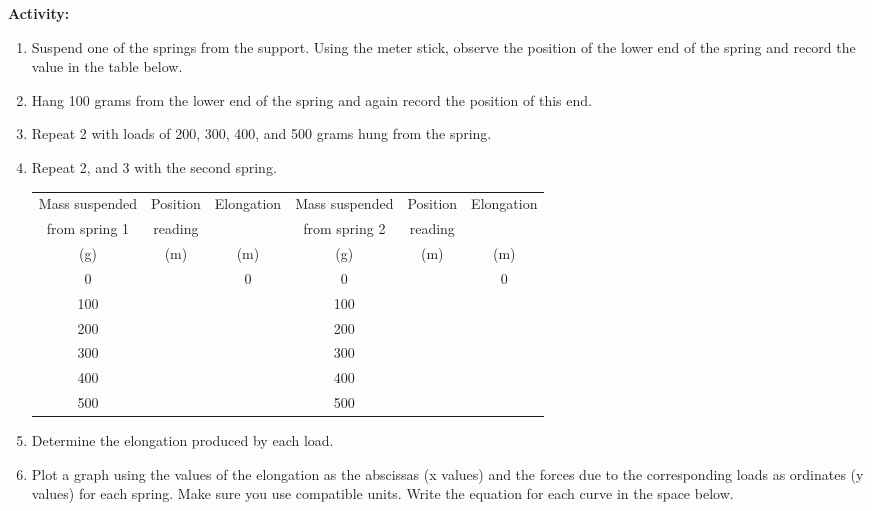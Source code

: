 {\noindent \bf Activity:} \begin{enumerate}



\item  Suspend one of the springs from the support. Using the meter stick, observe the position of the lower end of the spring and record the value in the table below.

\item  Hang 100 grams from the lower end of the spring and again record the position of this end.

\item  Repeat 2 with loads of 200, 300, 400, and 500 grams hung from the spring.

\item  Repeat 2, and 3 with the second spring.

\begin{center} \begin{tabular}{||c|c|c||c|c|c||} \hline \hline Mass suspended & Position & Elongation & Mass suspended & Position & Elongation \\ from spring 1 & reading & & from spring 2 & reading & \\ (g) & (m) & (m) & (g) & (m) & (m) \\ \hline \hline 0 & & 0 & 0 & & 0 \\ \hline 100 & & & 100 & & \\ \hline 200 & & & 200 & & \\ \hline 300 & & & 300 & & \\ \hline 400 & & & 400 & & \\ \hline 500 & & & 500 & & \\ \hline \hline \end{tabular} \end{center}

\item Determine the elongation produced by each load.

\item  Plot a graph using the values of the elongation as the abscissas (x values) and the forces due to the corresponding loads as ordinates (y values) for each spring. Make sure you use compatible units. Write the equation for each curve in the space below.

\vskip70pt

\end{enumerate}

